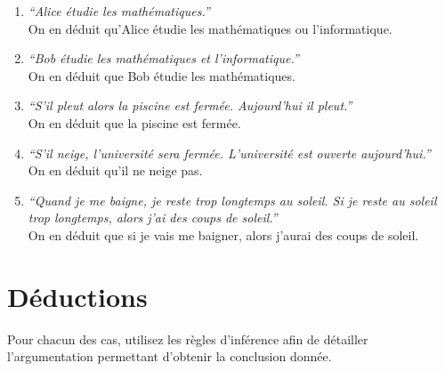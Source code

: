 \documentclass[a4paper,11pt]{article}
\begin{document}
\begin{enumerate}
\item \emph{``Alice étudie les mathématiques.''}\\
On en déduit qu'Alice étudie les mathématiques ou l'informatique.

\item \emph{``Bob étudie les mathématiques et l'informatique.''}\\
On en déduit que Bob étudie les mathématiques.

\item \emph{``S'il pleut alors la piscine est fermée. Aujourd'hui il pleut.''}\\
On en déduit que la piscine est fermée.

\item \emph{``S'il neige, l'université sera fermée. L'université est ouverte aujourd'hui.''}\\
On en déduit qu'il ne neige pas.

\item \emph{``Quand je me baigne, je reste trop longtemps au soleil. Si je reste au soleil trop longtemps, alors j'ai des coups de soleil.''}\\
On en déduit que si je vais me baigner, alors j'aurai des coups de soleil.
\end{enumerate}

\section{Déductions}

Pour chacun des cas, utilisez les règles d'inférence afin de détailler l'argumentation permettant d'obtenir la conclusion donnée.
\end{document}
